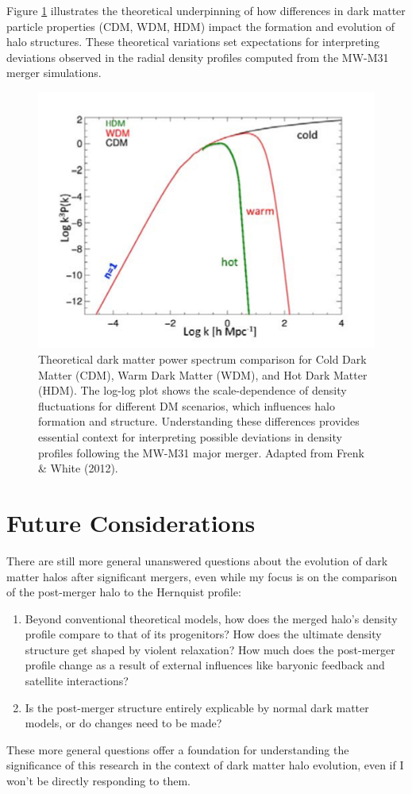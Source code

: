 \documentclass{mnras}
\begin{document}
Figure \ref{fig:method_diagram} illustrates the theoretical underpinning of how differences in dark matter particle properties (CDM, WDM, HDM) impact the formation and evolution of halo structures. These theoretical variations set expectations for interpreting deviations observed in the radial density profiles computed from the MW-M31 merger simulations.

\begin{figure}
    \centering
    \includegraphics[width=0.8\linewidth]{figure1.png}
    \caption{Theoretical dark matter power spectrum comparison for Cold Dark Matter (CDM), Warm Dark Matter (WDM), and Hot Dark Matter (HDM). The log-log plot shows the scale-dependence of density fluctuations for different DM scenarios, which influences halo formation and structure. Understanding these differences provides essential context for interpreting possible deviations in density profiles following the MW-M31 major merger. Adapted from Frenk \& White (2012).}
    \label{fig:method_diagram}
\end{figure}

\section{Future Considerations}

There are still more general unanswered questions about the evolution of dark matter halos after significant mergers, even while my focus is on the comparison of the post-merger halo to the Hernquist profile:
\begin{enumerate}
    \item Beyond conventional theoretical models, how does the merged halo's density profile compare to that of its progenitors?
    How does the ultimate density structure get shaped by violent relaxation?
    How much does the post-merger profile change as a result of external influences like baryonic feedback and satellite interactions?
    \item Is the post-merger structure entirely explicable by normal dark matter models, or do changes need to be made?
\end{enumerate}
These more general questions offer a foundation for understanding the significance of this research in the context of dark matter halo evolution, even if I won't be directly responding to them.
\end{document}
